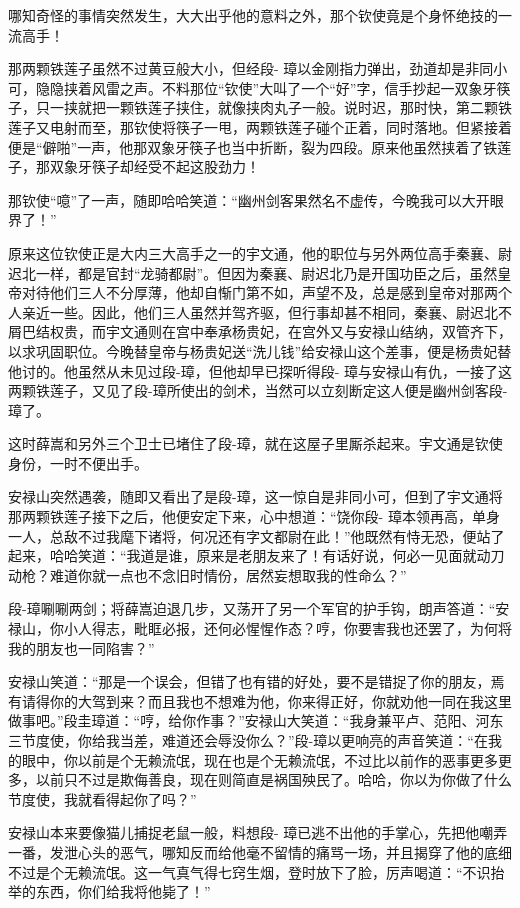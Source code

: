 \documentclass[12pt,oneside]{book}
\begin{document}
哪知奇怪的事情突然发生，大大出乎他的意料之外，那个钦使竟是个身怀绝技的一流高手！

那两颗铁莲子虽然不过黄豆般大小，但经段-
璋以金刚指力弹出，劲道却是非同小可，隐隐挟着风雷之声。不料那位``钦使''大叫了一个``好''字，信手抄起一双象牙筷子，只一挟就把一颗铁莲子挟住，就像挟肉丸子一般。说时迟，那时快，第二颗铁莲子又电射而至，那钦使将筷子一甩，两颗铁莲子碰个正着，同时落地。但紧接着便是``僻啪''一声，他那双象牙筷子也当中折断，裂为四段。原来他虽然挟着了铁莲子，那双象牙筷子却经受不起这股劲力！

那钦使``噫''了一声，随即哈哈笑道：``幽州剑客果然名不虚传，今晚我可以大开眼界了！''

原来这位钦使正是大内三大高手之一的宇文通，他的职位与另外两位高手秦襄、尉迟北一样，都是官封``龙骑都尉''。但因为秦襄、尉迟北乃是开国功臣之后，虽然皇帝对待他们三人不分厚薄，他却自惭门第不如，声望不及，总是感到皇帝对那两个人亲近一些。因此，他们三人虽然并驾齐驱，但行事却甚不相同，秦襄、尉迟北不屑巴结权贵，而宇文通则在宫中奉承杨贵妃，在宫外又与安禄山结纳，双管齐下，以求巩固职位。今晚替皇帝与杨贵妃送``洗儿钱''给安禄山这个差事，便是杨贵妃替他讨的。他虽然从未见过段-璋，但他却早已探听得段-
璋与安禄山有仇，一接了这两颗铁莲子，又见了段-璋所使出的剑术，当然可以立刻断定这人便是幽州剑客段-璋了。

这时薛嵩和另外三个卫士已堵住了段-璋，就在这屋子里厮杀起来。宇文通是钦使身份，一时不便出手。

安禄山突然遇袭，随即又看出了是段-璋，这一惊自是非同小可，但到了宇文通将那两颗铁莲子接下之后，他便安定下来，心中想道：``饶你段-
璋本领再高，单身一人，总敌不过我麾下诸将，何况还有字文都尉在此！''他既然有恃无恐，便站了起来，哈哈笑道：``我道是谁，原来是老朋友来了！有话好说，何必一见面就动刀动枪？难道你就一点也不念旧时情份，居然妄想取我的性命么？''

段-璋唰唰两剑；将薛嵩迫退几步，又荡开了另一个军官的护手钩，朗声答道：``安禄山，你小人得志，毗眶必报，还何必惺惺作态？哼，你要害我也还罢了，为何将我的朋友也一同陷害？''

安禄山笑道：``那是一个误会，但错了也有错的好处，要不是错捉了你的朋友，焉有请得你的大驾到来？而且我也不想难为他，你来得正好，你就劝他一同在我这里做事吧。''段圭璋道：``哼，给你作事？''安禄山大笑道：``我身兼平卢、范阳、河东三节度使，你给我当差，难道还会辱没你么？''段-璋以更响亮的声音笑道：``在我的眼中，你以前是个无赖流氓，现在也是个无赖流氓，不过比以前作的恶事更多更多，以前只不过是欺侮善良，现在则简直是祸国殃民了。哈哈，你以为你做了什么节度使，我就看得起你了吗？''

安禄山本来要像猫儿捕捉老鼠一般，料想段-
璋已逃不出他的手掌心，先把他嘲弄一番，发泄心头的恶气，哪知反而给他毫不留情的痛骂一场，并且揭穿了他的底细不过是个无赖流氓。这一气真气得七窍生烟，登时放下了脸，厉声喝道：``不识抬举的东西，你们给我将他毙了！''
\end{document}
